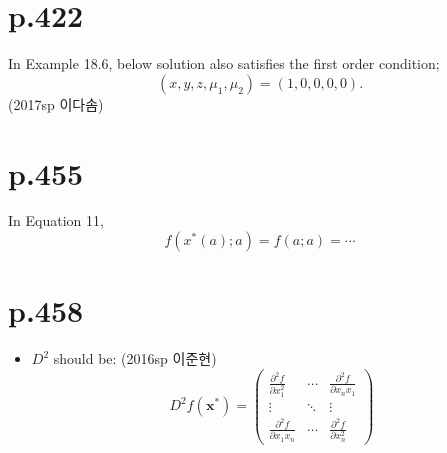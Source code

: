 \documentclass[a4paper]{article}
\begin{document}
\section{p.422} %
\label{sec:p_422}
In Example 18.6, below solution also satisfies the first order condition; \[
	(x,y,z,\mu_1,\mu_2) = (1,0,0,0,0).
\](2017sp 이다솜)

\section{p.455} %
\label{sec:p_455}
In Equation 11, \[
	f(x^\ast(a);a)=f(a;a)= \cdots
\]

\section{p.458} %
\label{sec:p_458}

\begin{itemize}
	\item $D^2$ should be: (2016sp 이준현)
	\[
		D^2 f(\mathbf{x^\ast}) = \begin{pmatrix}
			\frac{\partial^2 f}{\partial x_1^2} & \cdots & \frac{\partial^2 f}{\partial x_nx_1}\\
			\vdots & \ddots & \vdots \\
			\frac{\partial^2 f}{\partial x_1x_n} & \cdots & \frac{\partial^2 f}{\partial x_n^2}
		\end{pmatrix}
	\]
\end{itemize}

\end{document}
